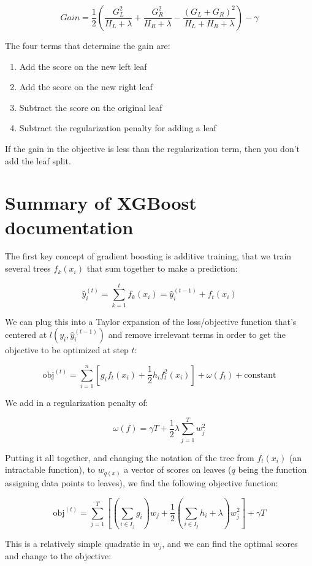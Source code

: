 \documentclass[12 pt, leqno]{article}
\begin{document}
$$Gain = \frac{1}{2} \left( \frac{G_L^2}{H_L + \lambda} + \frac{G_R^2}{H_R + \lambda} - \frac{(G_L + G_R)^2}{H_L + H_R + \lambda} \right) - \gamma $$

The four terms that determine the gain are:

\begin{enumerate}
\item Add the score on the new left leaf
\item Add the score on the new right leaf
\item Subtract the score on the original leaf
\item Subtract the regularization penalty for adding a leaf
\end{enumerate}

If the gain in the objective is less than the regularization term, then you don't add the leaf split.

\section{Summary of XGBoost documentation}

The first key concept of gradient boosting is additive training, that we train several trees $f_k(x_i)$ that sum together to make a prediction:

$$\hat{y}_i^{(t)} = \sum_{k = 1}^t f_k(x_i) = \hat{y}_i^{(t-1)} + f_t(x_i)$$

We can plug this into a Taylor expansion of the loss/objective function that's centered at $l(y_i, \hat{y}_i^{(t-1)})$ and remove irrelevant terms in order to get the objective to be optimized at step $t$:

$$ \text{obj}^{(t)} = \sum_{i = 1}^n [g_i f_t (x_i) + \frac{1}{2} h_i f_t^2 (x_i) ] + \omega(f_t) + \text{constant} $$

We add in a regularization penalty of:

$$\omega(f) = \gamma T + \frac{1}{2} \lambda \sum_{j = 1}^T w_j^2 $$

Putting it all together, and changing the notation of the tree from $f_t(x_i)$ (an intractable function), to $w_{q(x)}$ a vector of scores on leaves ($q$ being the function assigning data points to leaves), we find the following objective function:

$$\text{obj}^{(t)} = \sum_{j = 1}^T [(\sum_{i \in I_j} g_i) w_j + \frac{1}{2} (\sum_{i \in I_j} h_i + \lambda) w_j^2 ]  + \gamma T $$

This is a relatively simple quadratic in $w_j$, and we can find the optimal scores and change to the objective:
\end{document}
